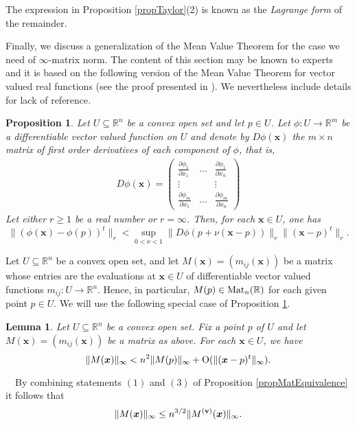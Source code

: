 \documentclass[10pt]{article}
\newcommand{\x}{{\bm x}}
\newcommand\proof{\noindent{\em Proof.}\ \ } \newcommand\mult{\mbox{\rm mult}}
\newcommand\R{{\mathbb R}}
\newtheorem{lemma}[theorem]{Lemma}
\newtheorem{prop}[theorem]{Proposition}
\begin{document}
The expression in Proposition \ref{propTaylor}(2) is known as the {\em Lagrange form} 
of the remainder.





Finally, we discuss a generalization of the Mean Value Theorem 
for  the case  we need of $\infty$-matrix norm.
The content of this section may be known  to experts and it is based on the following version 
of the Mean Value Theorem for vector valued real functions (see the proof presented in  \cite{HN}).
We nevertheless include  details for lack of reference.

\begin{prop}\label{propMeanValue}
Let $U \subseteq \R^n$  be a convex open set and let $p \in U$.
Let $\phi\colon U \rightarrow \R^m$ be a differentiable vector valued function on $U$
and denote by $D \phi(\x)$ the $m \times n$ matrix of first order derivatives 
of each component of $\phi$, that is,
\begin{eqnarray*}
D \phi(\x) = \left (
\begin{array}{ccc}
\frac{\partial \phi_1}{\partial x_1} & \ldots & \frac{\partial \phi_1}{\partial x_n}\\
\vdots & & \vdots\\
\frac{\partial \phi_m}{\partial x_1} & \ldots & \frac{\partial \phi_m}{\partial x_n}
\end{array}\right )
\end{eqnarray*}
Let either $r \ge 1$ be a real number or $r= \infty$. Then, for  each $\x \in U$, one has
$$
\| (\phi(\x) - \phi(p))^t \|_r < \sup_{0 < \nu< 1} \|D \phi(p+\nu(\x-p))\|_r  \|(\x -p)^t\|_r.
$$ 
\end{prop}


Let $U \subseteq \R^n$  be a convex open set,  and  let $M(\x)=(m_{ij}(\x))$ be a matrix   whose entries are the evaluations at $\x\in U$ of  differentiable vector valued  functions $m_{ij}\colon U\to \R^n$. Hence, in particular,  $M(p)\in{\rm Mat}_n(\R)$  for each given point $p\in U$.
We will use the following   special case of Proposition \ref{propMeanValue}.


\begin{lemma}\label{UppBoundH} Let $U \subseteq \R^n$  be a convex open set. Fix   a point $p$ of $U$ and 
let $M(\x)=(m_{ij}(\x))$ be a matrix  as above. For each $\x \in U$, we have
$$
\|M(\x)\|_\infty <  n^2\|M(p)\|_\infty+  {\rm O}(\|(\x-p)^t\|_\infty).
$$
\end{lemma}
\proof By combining  statements $(1)$ and $(3)$ of Proposition \ref{propMatEquivalence}
 it follows that
 \begin{equation}\label{strangeIneq}
\|M(\x)\|_\infty \le n^{3/2} \|M^{(\bf v)}(\x)\|_\infty.
\end{equation}
\end{document}
